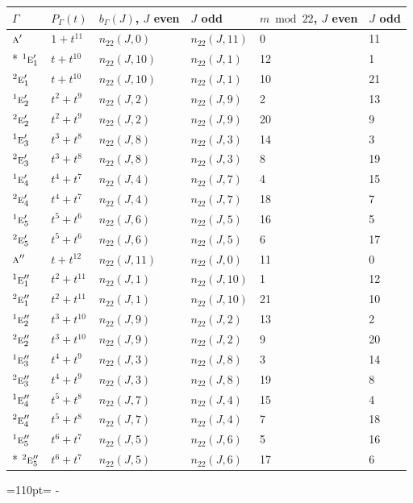 \documentclass[10pt,a4paper]{article}
\newcommand{\needspace}[1]{\par\penalty-100\begingroup\dimen0=#1\relax\dimen2=\pagegoal
  \advance\dimen2-\pagetotal\ifdim\dimen0>\dimen2\relax\ifdim\dimen2>0pt\vfil\break\fi\fi
  \endgroup}
\numberwithin{equation}{section}
\newcommand{\irr}[1]{\text{\normalfont\scshape #1}}
\newcommand{\conjpair}[1]{{}^{#1}}
\begin{document}
{\small\begin{longtable}{@{}llllll@{}}\toprule
$\Gamma$ & $P_\Gamma(t)$ & $b_\Gamma(J)$, $J$ even & $J$ odd & $m \bmod 22$, $J$ even & $J$ odd\\\midrule\endhead
\bottomrule\endfoot\endlastfoot
$\irr{a}'$ & $1 + t^{11}$ & $n_{22}(J,0)$ & $n_{22}(J,11)$ & 0 & 11\\*
$\conjpair{1}\irr{e}_{1}'$ & $t + t^{10}$ & $n_{22}(J,10)$ & $n_{22}(J,1)$ & 12 & 1\\
$\conjpair{2}\irr{e}_{1}'$ & $t + t^{10}$ & $n_{22}(J,10)$ & $n_{22}(J,1)$ & 10 & 21\\
$\conjpair{1}\irr{e}_{2}'$ & $t^{2} + t^{9}$ & $n_{22}(J,2)$ & $n_{22}(J,9)$ & 2 & 13\\
$\conjpair{2}\irr{e}_{2}'$ & $t^{2} + t^{9}$ & $n_{22}(J,2)$ & $n_{22}(J,9)$ & 20 & 9\\
$\conjpair{1}\irr{e}_{3}'$ & $t^{3} + t^{8}$ & $n_{22}(J,8)$ & $n_{22}(J,3)$ & 14 & 3\\
$\conjpair{2}\irr{e}_{3}'$ & $t^{3} + t^{8}$ & $n_{22}(J,8)$ & $n_{22}(J,3)$ & 8 & 19\\
$\conjpair{1}\irr{e}_{4}'$ & $t^{4} + t^{7}$ & $n_{22}(J,4)$ & $n_{22}(J,7)$ & 4 & 15\\
$\conjpair{2}\irr{e}_{4}'$ & $t^{4} + t^{7}$ & $n_{22}(J,4)$ & $n_{22}(J,7)$ & 18 & 7\\
$\conjpair{1}\irr{e}_{5}'$ & $t^{5} + t^{6}$ & $n_{22}(J,6)$ & $n_{22}(J,5)$ & 16 & 5\\
$\conjpair{2}\irr{e}_{5}'$ & $t^{5} + t^{6}$ & $n_{22}(J,6)$ & $n_{22}(J,5)$ & 6 & 17\\
$\irr{a}''$ & $t + t^{12}$ & $n_{22}(J,11)$ & $n_{22}(J,0)$ & 11 & 0\\
$\conjpair{1}\irr{e}_{1}''$ & $t^{2} + t^{11}$ & $n_{22}(J,1)$ & $n_{22}(J,10)$ & 1 & 12\\
$\conjpair{2}\irr{e}_{1}''$ & $t^{2} + t^{11}$ & $n_{22}(J,1)$ & $n_{22}(J,10)$ & 21 & 10\\
$\conjpair{1}\irr{e}_{2}''$ & $t^{3} + t^{10}$ & $n_{22}(J,9)$ & $n_{22}(J,2)$ & 13 & 2\\
$\conjpair{2}\irr{e}_{2}''$ & $t^{3} + t^{10}$ & $n_{22}(J,9)$ & $n_{22}(J,2)$ & 9 & 20\\
$\conjpair{1}\irr{e}_{3}''$ & $t^{4} + t^{9}$ & $n_{22}(J,3)$ & $n_{22}(J,8)$ & 3 & 14\\
$\conjpair{2}\irr{e}_{3}''$ & $t^{4} + t^{9}$ & $n_{22}(J,3)$ & $n_{22}(J,8)$ & 19 & 8\\
$\conjpair{1}\irr{e}_{4}''$ & $t^{5} + t^{8}$ & $n_{22}(J,7)$ & $n_{22}(J,4)$ & 15 & 4\\
$\conjpair{2}\irr{e}_{4}''$ & $t^{5} + t^{8}$ & $n_{22}(J,7)$ & $n_{22}(J,4)$ & 7 & 18\\
$\conjpair{1}\irr{e}_{5}''$ & $t^{6} + t^{7}$ & $n_{22}(J,5)$ & $n_{22}(J,6)$ & 5 & 16\\*
$\conjpair{2}\irr{e}_{5}''$ & $t^{6} + t^{7}$ & $n_{22}(J,5)$ & $n_{22}(J,6)$ & 17 & 6\\
\bottomrule\end{longtable}}
\needspace{110pt}
\end{document}

